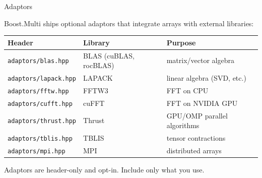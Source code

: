 \begin{frame}{Adaptors}

Boost.Multi ships optional adaptors that integrate arrays with external libraries:

\begin{table}
\small
\begin{tabular}{lll}
\textbf{Header} & \textbf{Library} & \textbf{Purpose} \\
\hline
\lstinline|adaptors/blas.hpp|    & BLAS (cuBLAS, rocBLAS) & matrix/vector algebra \\
\lstinline|adaptors/lapack.hpp|  & LAPACK               & linear algebra (SVD, etc.) \\
\lstinline|adaptors/fftw.hpp|    & FFTW3                & FFT on CPU \\
\lstinline|adaptors/cufft.hpp|   & cuFFT                & FFT on NVIDIA GPU \\
\lstinline|adaptors/thrust.hpp|  & Thrust               & GPU/OMP parallel algorithms \\
\lstinline|adaptors/tblis.hpp|   & TBLIS                & tensor contractions \\
\lstinline|adaptors/mpi.hpp|     & MPI                  & distributed arrays \\
\end{tabular}
\end{table}

\begin{block}{}
  Adaptors are header-only and opt-in. Include only what you use.
\end{block}

\end{frame}

